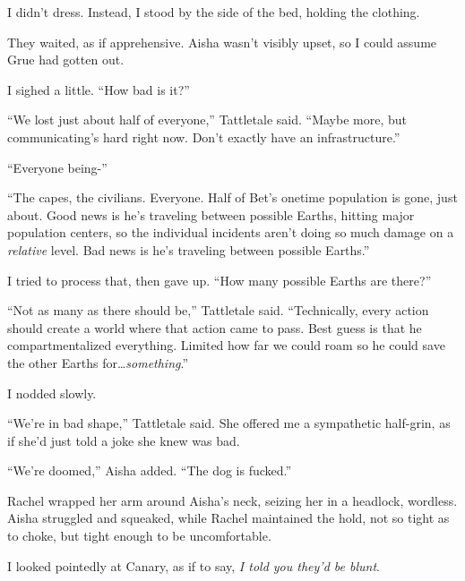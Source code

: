 I didn't dress.  Instead, I stood by the side of the bed, holding the clothing.



They waited, as if apprehensive.  Aisha wasn't visibly upset, so I could assume Grue had gotten out.



I sighed a little.  ``How bad is it?''



``We lost just about half of everyone,'' Tattletale said.  ``Maybe more, but communicating's hard right now.  Don't exactly have an infrastructure.''



``Everyone being-''



``The capes, the civilians.  Everyone.  Half of Bet's onetime population is gone, just about.  Good news is he's traveling between possible Earths, hitting major population centers, so the individual incidents aren't doing so much damage on a \emph{relative} level.  Bad news is he's traveling between possible Earths.''



I tried to process that, then gave up.  ``How many possible Earths are there?''



``Not as many as there should be,'' Tattletale said.  ``Technically, every action should create a world where that action came to pass.  Best guess is that he compartmentalized everything.  Limited how far we could roam so he could save the other Earths for\ldots \emph{something}.''



I nodded slowly.



``We're in bad shape,'' Tattletale said.  She offered me a sympathetic half-grin, as if she'd just told a joke she knew was bad.



``We're doomed,'' Aisha added.  ``The dog is fucked.''



Rachel wrapped her arm around Aisha's neck, seizing her in a headlock, wordless.  Aisha struggled and squeaked, while Rachel maintained the hold, not so tight as to choke, but tight enough to be uncomfortable.



I looked pointedly at Canary, as if to say, \emph{I told you they'd be blunt}.



